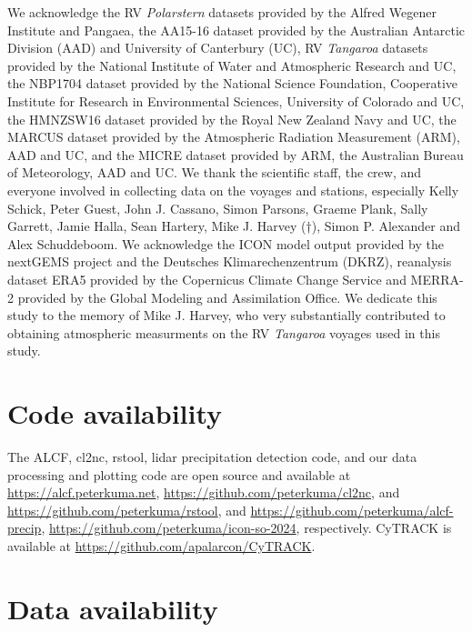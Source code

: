 \documentclass[12pt,a4paper]{article}
\begin{document}
We acknowledge the RV \emph{Polarstern} datasets provided by the Alfred Wegener
Institute and Pangaea, the AA15-16 dataset provided by the Australian Antarctic
Division (AAD) and University of Canterbury (UC), RV \emph{Tangaroa} datasets
provided by the National Institute of Water and Atmospheric Research and UC,
the NBP1704 dataset provided by the National Science Foundation, Cooperative
Institute for Research in Environmental Sciences, University of Colorado and
UC, the HMNZSW16 dataset provided by the Royal New Zealand Navy and UC, the
MARCUS dataset provided by the Atmospheric Radiation Measurement (ARM), AAD and
UC, and the MICRE dataset provided by ARM, the Australian Bureau of
Meteorology, AAD and UC. We thank the scientific staff, the crew, and everyone
involved in collecting data on the voyages and stations, especially Kelly
Schick, Peter Guest, John J.  Cassano, Simon Parsons, Graeme Plank, Sally
Garrett, Jamie Halla, Sean Hartery, Mike J.  Harvey (†), Simon P.  Alexander
and Alex Schuddeboom. We acknowledge the ICON model output provided by the
nextGEMS project and the Deutsches Klimarechenzentrum (DKRZ), reanalysis
dataset ERA5 provided by the Copernicus Climate Change Service and MERRA-2
provided by the Global Modeling and Assimilation Office. We dedicate this study
to the memory of Mike J. Harvey, who very substantially contributed to
obtaining atmospheric measurments on the RV \emph{Tangaroa} voyages used in
this study.

\section*{Code availability}

The ALCF, cl2nc, rstool, lidar precipitation detection code, and our data
processing and plotting code are open source and available at
\url{https://alcf.peterkuma.net}, \url{https://github.com/peterkuma/cl2nc}, and
\url{https://github.com/peterkuma/rstool}, and
\url{https://github.com/peterkuma/alcf-precip},
\url{https://github.com/peterkuma/icon-so-2024}, respectively. CyTRACK is
available at \url{https://github.com/apalarcon/CyTRACK}.

\section*{Data availability}
\end{document}
